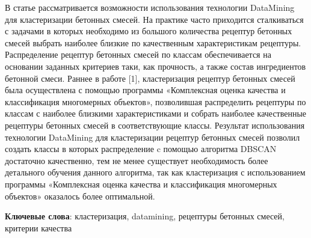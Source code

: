 В статье рассматривается возможности использования технологии DataMining
для кластеризации бетонных смесей. На практике часто приходится
сталкиваться с задачами в которых необходимо из большого количества
рецептур бетонных смесей выбрать наиболее близкие по качественным
характеристикам рецептуры. Распределение рецептур бетонных смесей по
классам обеспечивается на основании заданных критериев таки, как
прочность, а также состав ингредиентов бетонной смеси. Раннее в работе
{[}1{]}, кластеризация рецептур бетонных смесей была осуществлена с
помощью программы «Комплексная оценка качества и классификация
многомерных объектов», позволившая распределить рецептуры по классам с
наиболее близкими характеристиками и собрать наиболее качественные
рецептуры бетонных смесей в соответствующие классы. Результат
использования технологии DataMining для кластеризации рецептур бетонных
смесей позволил создать классы в которых распределение c помощью
алгоритма DBSCAN достаточно качественно, тем не менее существует
необходимость более детального обучения данного алгоритма, так как
кластеризация с использованием программы «Комплексная оценка качества и
классификация многомерных объектов» оказалось более оптимальной.

{\bfseries Ключевые слова}: кластеризация, datamining, рецептуры бетонных
смесей, критерии качества

\vspace{0.5em}


